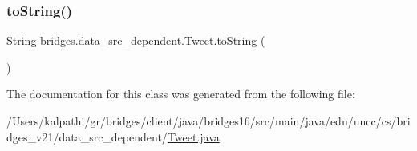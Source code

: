 \hypertarget{classbridges_1_1data__src__dependent_1_1_tweet_adfba67504a7463a7f16aff46d2bb893f}{}\label{classbridges_1_1data__src__dependent_1_1_tweet_adfba67504a7463a7f16aff46d2bb893f} 
\subsubsection{\texorpdfstring{to\+String()}{toString()}}
{\footnotesize\ttfamily String bridges.\+data\+\_\+src\+\_\+dependent.\+Tweet.\+to\+String (\begin{DoxyParamCaption}{ }\end{DoxyParamCaption})}



The documentation for this class was generated from the following file\+:\begin{DoxyCompactItemize}
\item 
/\+Users/kalpathi/gr/bridges/client/java/bridges16/src/main/java/edu/uncc/cs/bridges\+\_\+v21/data\+\_\+src\+\_\+dependent/\hyperlink{_tweet_8java}{Tweet.\+java}\end{DoxyCompactItemize}
